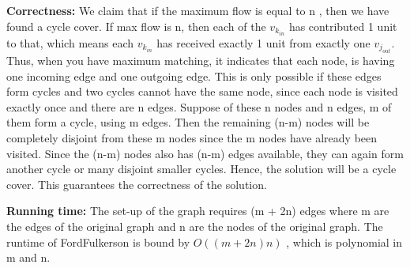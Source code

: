 \documentclass{article}
\newcommand\correctness{\vspace{.10in}\textbf{Correctness: }}
\newcommand\runtime{\vspace{.10in}\textbf{Running time: }}
\begin{document}
  \correctness We claim that if the maximum flow is equal to n , then we have found a cycle cover. If max flow is n, then each of the $v_{k_{in}}$ has contributed 1 unit to that, which means each $v_{k_{in}}$ has received exactly 1 unit from exactly one $v_{j_{out}}$. Thus, when you have maximum matching, it indicates that each node, is having one incoming edge and one outgoing edge. This is only possible if these edges form cycles and two cycles cannot have the same node, since each node is visited exactly once and there are n edges. Suppose of these n nodes and n edges, m of them form a cycle, using m edges. Then the remaining (n-m) nodes will be completely disjoint from these m nodes since the m nodes have already been visited. Since the (n-m) nodes also has (n-m) edges available, they can again form another cycle or many disjoint smaller cycles. Hence, the solution will be a cycle cover. This guarantees the correctness of the solution. \newline

  \runtime 
  The set-up of the graph requires (m + 2n) edges where m are the edges of the original graph and n are the nodes of the original graph. The runtime of FordFulkerson is bound by $O((m+2n)n)$ , which is polynomial in m and n. \newline
   
 
\end{document}
